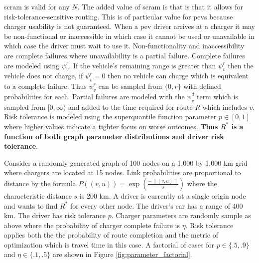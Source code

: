 \documentclass[12pt]{article}
\begin{document}
\gls{scram} is valid for any $N$. The added value of \gls{scram} is that is that it allows for risk-tolerance-sensitive routing. This is of particular value for \glspl{pev} because charger usability is not guaranteed. When a \gls{pev} driver arrives at a charger it may be non-functional or inaccessible in which case it cannot be used or unavailable in which case the driver must wait to use it. Non-functionality and inaccessibility are complete failures where unavailability is a partial failure. Complete failures are modeled using $\psi_v^r$. If the vehicle's remaining range is greater than $\psi_v^r$ then the vehicle does not charge, if $\psi_v^r = 0$ then no vehicle can charge which is equivalent to a complete failure. Thus $\psi_v^r$ can be sampled from $\{0, r\}$ with defined probabilities for each. Partial failures are modeled with the $\psi_v^d$ term which is sampled from $[0, \infty)$ and added to the time required for route $R$ which includes $v$. Risk tolerance is modeled using the superquantile function parameter $p \in [0, 1]$ where higher values indicate a tighter focus on worse outcomes. \textbf{Thus $R^*$ is a function of both graph parameter distributions and driver risk tolerance}.

Consider a randomly generated graph of 100 nodes on a 1,000 by 1,000 km grid where chargers are located at 15 nodes. Link probabilities are proportional to distance by the formula $P((v, u)) = \exp(\frac{-\rVert(v, u)\rVert}{s})$ where the characteristic distance $s$ is 200 km. A driver is currently at a single origin node and wants to find $R^*$ for every other node. The driver's car has a range of 400 km. The driver has risk tolerance $p$. Charger parameters are randomly sample as above where the probability of charger complete failure is $\eta$. Risk tolerance applies both the the probability of route completion and the metric of optimization which is travel time in this case. A factorial of cases for $p \in \{.5, .9\}$ and $\eta \in \{.1, .5\}$ are shown in Figure \ref{fig:parameter_factorial}.
\end{document}
